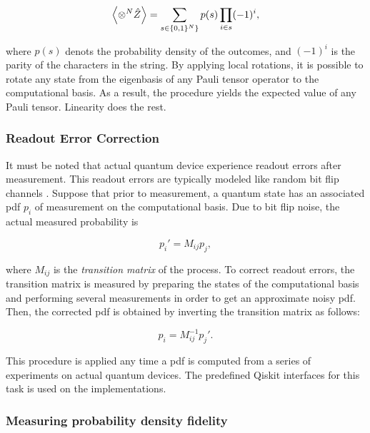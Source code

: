     \begin{equation}
      \expval{\otimes^{N} \hat{Z}} = \sum_{s \in \{0,1\}^{N}\}} p(s) \prod_{i \in s} (-1)^{i},
      \label{eq:expValPauliZ}
    \end{equation}

    \noindent where $p(s)$ denots the probability density of the outcomes, and $(-1)^{i}$ is the parity of the characters in the string. By applying local rotations, it is possible to rotate any state from the eigenbasis of any Pauli tensor operator to the computational basis. As a result, the procedure yields the expected value of any Pauli tensor. Linearity does the rest.

    \subsubsection{Readout Error Correction}
    \label{subsubsec:readoutErrorCorrection}

      It must be noted that actual quantum device experience readout errors after measurement. This readout errors are typically modeled like random bit flip channels \cite{Nielsen, Strini}. Suppose that prior to measurement, a quantum state has an associated pdf $p_i$ of measurement on the computational basis. Due to bit flip noise, the actual measured probability is

      \begin{equation}
        p_i' = M_{ij} p_j,
        \label{eq:MarkovMatrix}
      \end{equation}

      \noindent where $M_{ij}$ is the \textit{transition matrix} of the process. To correct readout errors, the transition matrix is measured by preparing the states of the computational basis and performing several measurements in order to get an approximate noisy pdf. Then, the corrected pdf is obtained by inverting the transition matrix as follows:

      \begin{equation}
        p_i = M_{ij}^{-1} p_j'.
        \label{eq:MarkovMatrix}
      \end{equation}

      This procedure is applied any time a pdf is computed from a series of experiments on actual quantum devices. The predefined Qiskit interfaces for this task is used on the implementations.

    \subsubsection{Measuring probability density fidelity}
    \label{subsubsec:PdfFidelityMeasurement}

